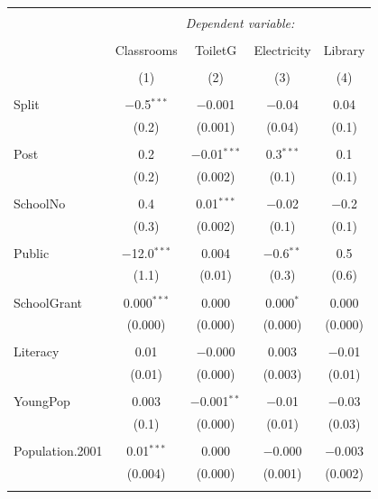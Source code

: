 \documentclass[12pt, a4paper]{article}
\begin{document}
\begin{table}[!htbp] \centering 
  \caption{} 
  \label{} 
\begin{tabular}{@{\extracolsep{5pt}}lcccc} 
\\[-1.8ex]\hline 
\hline \\[-1.8ex] 
 & \multicolumn{4}{c}{\textit{Dependent variable:}} \\ 
\cline{2-5} 
\\[-1.8ex] & Classrooms & ToiletG & Electricity & Library \\ 
\\[-1.8ex] & (1) & (2) & (3) & (4)\\ 
\hline \\[-1.8ex] 
 Split & $-$0.5$^{***}$ & $-$0.001 & $-$0.04 & 0.04 \\ 
  & (0.2) & (0.001) & (0.04) & (0.1) \\ 
  & & & & \\ 
 Post & 0.2 & $-$0.01$^{***}$ & 0.3$^{***}$ & 0.1 \\ 
  & (0.2) & (0.002) & (0.1) & (0.1) \\ 
  & & & & \\ 
 SchoolNo & 0.4 & 0.01$^{***}$ & $-$0.02 & $-$0.2 \\ 
  & (0.3) & (0.002) & (0.1) & (0.1) \\ 
  & & & & \\ 
 Public & $-$12.0$^{***}$ & 0.004 & $-$0.6$^{**}$ & 0.5 \\ 
  & (1.1) & (0.01) & (0.3) & (0.6) \\ 
  & & & & \\ 
 SchoolGrant & 0.000$^{***}$ & 0.000 & 0.000$^{*}$ & 0.000 \\ 
  & (0.000) & (0.000) & (0.000) & (0.000) \\ 
  & & & & \\ 
 Literacy & 0.01 & $-$0.000 & 0.003 & $-$0.01 \\ 
  & (0.01) & (0.000) & (0.003) & (0.01) \\ 
  & & & & \\ 
 YoungPop & 0.003 & $-$0.001$^{**}$ & $-$0.01 & $-$0.03 \\ 
  & (0.1) & (0.000) & (0.01) & (0.03) \\ 
  & & & & \\ 
 Population.2001 & 0.01$^{***}$ & 0.000 & $-$0.000 & $-$0.003 \\ 
  & (0.004) & (0.000) & (0.001) & (0.002) \\ 
  & & & & \\ 

\end{tabular}
\end{table}
\end{document}
